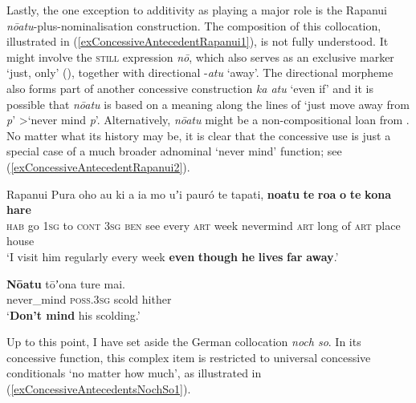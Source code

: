 Lastly, the one exception to additivity as playing a major role is the Rapanui \textit{nōatu}-plus-nominalisation construction. The composition of this collocation, illustrated in (\ref{exConcessiveAntecedentRapanui1}), is not fully understood. It might involve the \textsc{still} expression \textit{nō}, which also serves as an exclusive marker \lq just, only\rq{ }(), together with directional \mbox{-\textit{atu}} \lq away\rq{}. The directional morpheme also forms part of another concessive construction \textit{ka atu} \lq even if\rq{} \parencite[569–570]{Kieviet2017} and it is possible that \textit{nōatu} is based on a meaning along the lines of \lq just move away from \textit{p}\rq{ }>\lq never mind \textit{p}\rq{}. Alternatively, \textit{nōatu} might be a non-compositional loan from  \parencite[570 fn34]{Kieviet2017}. No matter what its history may be, it is clear that the concessive use is just a special case of a much broader adnominal \lq never mind\rq{ }function; see (\ref{exConcessiveAntecedentRapanui2}).

\begin{exe}
	\ex \label{exConcessiveAntecedentRapanui}
	\begin{xlist}
		\exi{}Rapanui
		\ex \label{exConcessiveAntecedentRapanui1}
		 \gll Pura oho au ki a ia mo uʼi pauró te tapati, \textbf{noatu} \textbf{te} \textbf{roa} \textbf{o} \textbf{te} \textbf{kona} \textbf{hare}\\
		 \textsc{hab} go 1\textsc{sg} to \textsc{cont} 3\textsc{sg} \textsc{ben} see every \textsc{art} week nevermind \textsc{art} long of \textsc{art} place house\\
		 \glt \lq I visit him regularly every week \textbf{even} \textbf{though} \textbf{he} \textbf{lives} \textbf{far} \textbf{away}.' \parencite[59]{duFeu1996}
		 
		 \ex \label{exConcessiveAntecedentRapanui2}
		\gll\textbf{Nōatu} tōʼona ture mai.\\
		never\_mind \textsc{poss}.3\textsc{sg} scold hither\\
		\glt \lq\textbf{Don't mind} his scolding.' \parencite[305]{Kieviet2017}	 
	\end{xlist}
\end{exe}

Up to this point, I have set aside the German collocation \textit{noch so}. In its concessive function, this complex item is restricted to universal concessive conditionals \lq no matter how much\rq{}, as illustrated in (\ref{exConcessiveAntecedentsNochSo1}).
 
